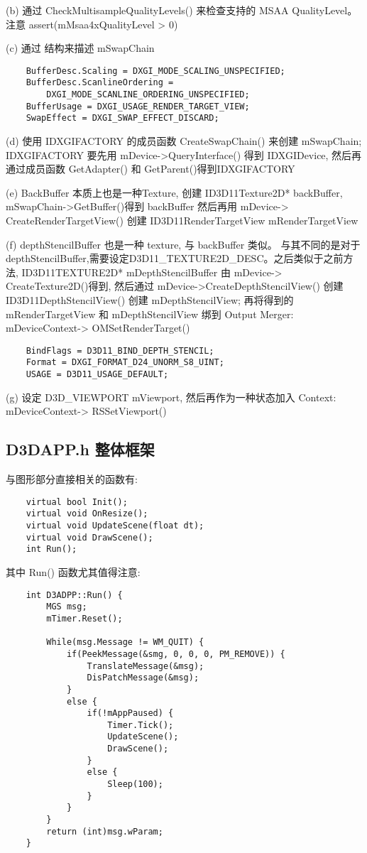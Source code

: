 \documentclass[10pt, a4paper]{article}
\begin{document}
        \quad(b) 通过 CheckMultisampleQualityLevels() 来检查支持的 MSAA QualityLevel。注意 assert(mMsaa4xQualityLevel > 0)

        \quad(c) 通过  结构来描述 mSwapChain
\begin{lstlisting}
    BufferDesc.Scaling = DXGI_MODE_SCALING_UNSPECIFIED;
    BufferDesc.ScanlineOrdering = 
        DXGI_MODE_SCANLINE_ORDERING_UNSPECIFIED;
    BufferUsage = DXGI_USAGE_RENDER_TARGET_VIEW;
    SwapEffect = DXGI_SWAP_EFFECT_DISCARD;
\end{lstlisting}

        \quad(d) 使用 IDXGIFACTORY 的成员函数 CreateSwapChain() 来创建 mSwapChain; IDXGIFACTORY 要先用 mDevice->QueryInterface() 得到 IDXGIDevice, 然后再通过成员函数 GetAdapter() 和 GetParent()得到IDXGIFACTORY 

        \quad(e) BackBuffer 本质上也是一种Texture, 创建 ID3D11Texture2D* backBuffer, mSwapChain->GetBuffer()得到 backBuffer 然后再用 mDevice-> CreateRenderTargetView() 创建 ID3D11RenderTargetView mRenderTargetView 

        \quad(f) depthStencilBuffer 也是一种 texture, 与 backBuffer 类似。 与其不同的是对于 depthStencilBuffer,需要设定D3D11\_TEXTURE2D\_DESC。之后类似于之前方法, ID3D11TEXTURE2D* mDepthStencilBuffer 由 mDevice-> CreateTexture2D()得到, 然后通过 mDevice->CreateDepthStencilView() 创建 ID3D11DepthStencilView() 创建 mDepthStencilView; 再将得到的 mRenderTargetView 和 mDepthStencilView 绑到 Output Merger: mDeviceContext-> OMSetRenderTarget()
\begin{lstlisting}
    BindFlags = D3D11_BIND_DEPTH_STENCIL;
    Format = DXGI_FORMAT_D24_UNORM_S8_UINT; 
    USAGE = D3D11_USAGE_DEFAULT;
\end{lstlisting}

        \quad(g) 设定 D3D\_VIEWPORT mViewport, 然后再作为一种状态加入 Context: mDeviceContext-> RSSetViewport()

    \subsection{D3DAPP.h 整体框架}
    与图形部分直接相关的函数有:
\begin{lstlisting}
    virtual bool Init(); 
    virtual void OnResize(); 
    virtual void UpdateScene(float dt); 
    virtual void DrawScene(); 
    int Run();
\end{lstlisting}

    其中 Run() 函数尤其值得注意:
\begin{lstlisting}
    int D3ADPP::Run() {
        MGS msg; 
        mTimer.Reset(); 

        While(msg.Message != WM_QUIT) {
            if(PeekMessage(&smg, 0, 0, 0, PM_REMOVE)) {
                TranslateMessage(&msg);
                DisPatchMessage(&msg);
            }
            else {
                if(!mAppPaused) {
                    Timer.Tick();
                    UpdateScene(); 
                    DrawScene();
                }
                else {
                    Sleep(100); 
                }
            }
        }
        return (int)msg.wParam;
    }
\end{lstlisting}
\end{document}
